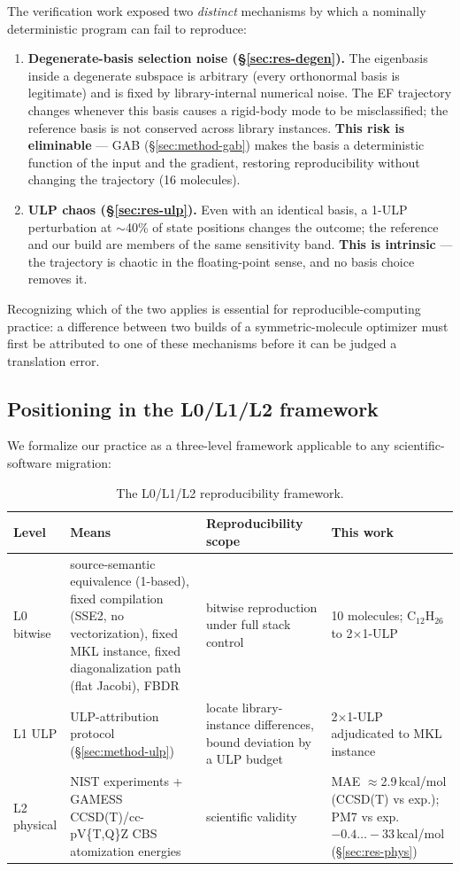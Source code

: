 \documentclass[preprint,12pt]{elsarticle}
\begin{document}
The verification work exposed two \emph{distinct} mechanisms by which a nominally deterministic program can fail to reproduce:
\begin{enumerate}
\item \textbf{Degenerate-basis selection noise (\S\ref{sec:res-degen}).} The eigenbasis inside a degenerate subspace is arbitrary (every orthonormal basis is legitimate) and is fixed by library-internal numerical noise. The EF trajectory changes whenever this basis causes a rigid-body mode to be misclassified; the reference basis is not conserved across library instances. \textbf{This risk is eliminable} --- GAB (\S\ref{sec:method-gab}) makes the basis a deterministic function of the input and the gradient, restoring reproducibility without changing the trajectory (16 molecules).
\item \textbf{ULP chaos (\S\ref{sec:res-ulp}).} Even with an identical basis, a 1-ULP perturbation at $\sim$40\% of state positions changes the outcome; the reference and our build are members of the same sensitivity band. \textbf{This is intrinsic} --- the trajectory is chaotic in the floating-point sense, and no basis choice removes it.
\end{enumerate}
Recognizing which of the two applies is essential for reproducible-computing practice: a difference between two builds of a symmetric-molecule optimizer must first be attributed to one of these mechanisms before it can be judged a translation error.

\subsection{Positioning in the L0/L1/L2 framework}\label{sec:disc-framework}

We formalize our practice as a three-level framework applicable to any scientific-software migration:
\begin{table}[h]
\centering
\caption{The L0/L1/L2 reproducibility framework.}\label{tab:framework}
\begin{tabular}{p{}p{}p{}p{}}
\toprule
Level & Means & Reproducibility scope & This work \\
\midrule
L0 bitwise & source-semantic equivalence (1-based), fixed compilation (SSE2, no vectorization), fixed MKL instance, fixed diagonalization path (flat Jacobi), FBDR & bitwise reproduction under full stack control & 10 molecules; C$_{12}$H$_{26}$ to 2$\times$1-ULP \\
L1 ULP & ULP-attribution protocol (\S\ref{sec:method-ulp}) & locate library-instance differences, bound deviation by a ULP budget & 2$\times$1-ULP adjudicated to MKL instance \\
L2 physical & NIST experiments + GAMESS CCSD(T)/cc-pV\{T,Q\}Z CBS atomization energies & scientific validity & MAE $\approx$2.9\,kcal/mol (CCSD(T) vs exp.); PM7 vs exp.\ $-0.4\ldots-33$\,kcal/mol (\S\ref{sec:res-phys}) \\
\bottomrule
\end{tabular}
\end{table}
\end{document}

